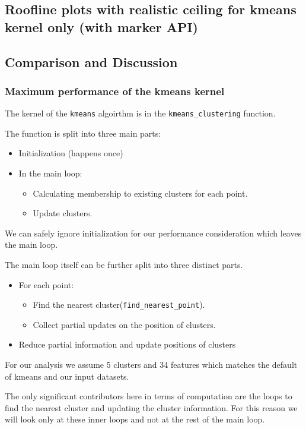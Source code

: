 \subsection{Roofline plots with realistic ceiling for kmeans kernel only (with marker API)}

\subsection{Comparison and Discussion}


\subsubsection{Maximum performance of the kmeans kernel}

The kernel of the \texttt{kmeans} algoirthm is in the \texttt{kmeans\_clustering} function.

The function is split into three main parts:
\begin{itemize}
	\item Initialization (happens once)
	\item In the main loop:
	\begin{itemize}
		\item Calculating membership to existing clusters for each point.
		\item Update clusters.
	\end{itemize}
\end{itemize}

We can safely ignore initialization for our performance consideration which leaves the main loop.

The main loop itself can be further split into three distinct parts.
\begin{itemize}
	\item For each point:
	\begin{itemize}
		\item Find the nearest cluster(\texttt{find\_nearest\_point}).
		\item Collect partial updates on the position of clusters.
	\end{itemize}
	\item Reduce partial information and update positions of clusters 	
\end{itemize}

For our analysis we assume 5 clusters and 34 features which matches
the default of kmeans and our input datasets.

The only significant contributors here in terms of computation are the loops to find the nearest cluster and updating the cluster information.
For this reason we will look only at these inner loops and not at the rest of the main loop.

